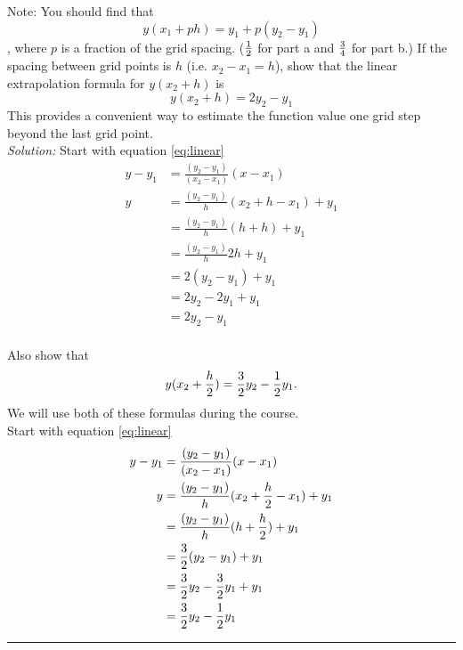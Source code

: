 \begin{enumerate}
\begin{enumerate}
\fi

Note: You should find that 
\begin{equation}
y(x_1 + p h) = y_1 + p (y_2 - y_1)
\end{equation}
, where $p$ is a fraction of the grid spacing. (${1\over 2}$ for part
a and ${3\over 4}$ for part b.)
\subprob If the spacing between grid points is $h$ (i.e.
    $x_2-x_1=h$), show that the linear extrapolation formula
    for $y(x_2+h)$ is
    \begin{equation}\label{eq:linExtrap}
        y(x_2+h) = 2 y_2 - y_1
    \end{equation}
    This provides a convenient way to estimate the function
    value one grid step beyond the last grid point. \\ 
\ifsolutions
\textit{Solution:}
Start with equation \eqref{eq:linear}
\begin{align} 
    y-y_1 &= \frac{ (y_2-y_1) }{ (x_2-x_1) } (x-x_1)\\
y &= \frac{ (y_2-y_1) }{ h } (x_2 + h -x_1) + y_1\\
&= \frac{ (y_2-y_1) }{ h } (h  + h) + y_1\\
&= \frac{ (y_2-y_1) }{ h } 2h + y_1\\
&= 2(y_2-y_1) + y_1\\
&= 2y_2-2y_1 + y_1\\
&= 2y_2-y_1\\
\end{align}
\fi

\subprob Also show that
    \begin{equation}\label{eq:linExtraphalf}
        y(x_2+{ h\over 2}) = {3\over 2} y_2 - {1\over 2}y_1 .
    \end{equation}
    We will use both of these formulas during the course.\\
\ifsolutions
Start with equation \eqref{eq:linear}
\begin{align} 
    y-y_1 &= \frac{ (y_2-y_1) }{ (x_2-x_1) } (x-x_1)\\
y &= \frac{ (y_2-y_1) }{ h } (x_2 + {h \over 2} -x_1) + y_1\\
&= \frac{ (y_2-y_1) }{ h } (h  + {h\over 2}) + y_1\\
&= {3\over 2}(y_2-y_1) + y_1\\
&= {3\over 2} y_2- {3\over 2} y_1 + y_1\\
&= {3\over 2} y_2-{1\over 2} y_1\\
\end{align}

\fi
\noindent\rule{4 in}{0.01 in}

\end{enumerate}
\end{enumerate}

